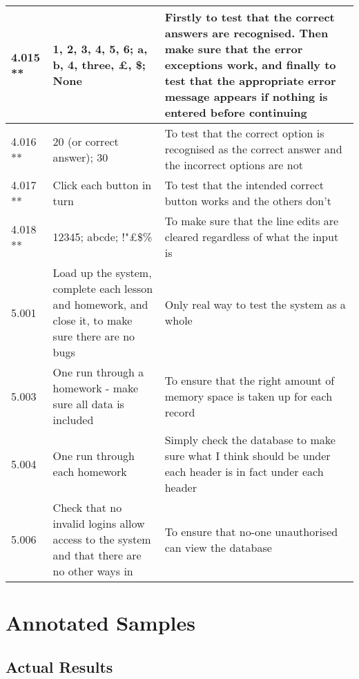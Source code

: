 \begin{landscape}
\begin{center}
\begin{longtable}{|p{4cm}|p{4cm}|p{5cm}|}
4.015 ** & 1, 2, 3, 4, 5, 6; a, b, 4, three, £, \$; None & Firstly to test that the correct answers are recognised. Then make sure that the error exceptions work, and finally to test that the appropriate error message appears if nothing is entered before continuing \\ \hline
4.016 ** & 20 (or correct answer); 30 & To test that the correct option is recognised as the correct answer and the incorrect options are not \\ \hline
4.017 ** & Click each button in turn & To test that the intended correct button works and the others don't \\ \hline
4.018 ** & 12345; abcde; !"£\$\% & To make sure that the line edits are cleared regardless of what the input is \\ \hline
5.001 & Load up the system, complete each lesson and homework, and close it, to make sure there are no bugs & Only real way to test the system as a whole \\ \hline
5.003 & One run through a homework - make sure all data is included & To ensure that the right amount of memory space is taken up for each record \\ \hline
5.004 & One run through each homework & Simply check the database to make sure what I think should be under each header is in fact under each header \\ \hline
5.006 & Check that no invalid logins allow access to the system and that there are no other ways in & To ensure that no-one unauthorised can view the database \\ \hline
\end{longtable}
\end{center}

\section{Annotated Samples}

\subsection{Actual Results}


\end{landscape}
